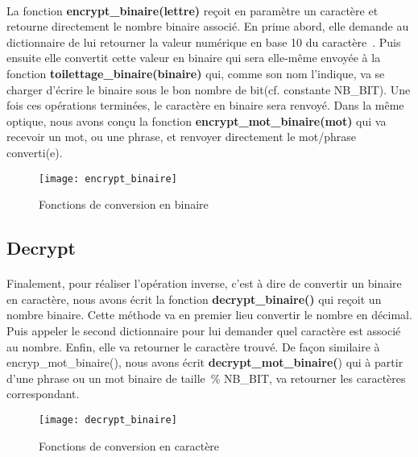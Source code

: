 \documentclass[11pt,fleqn]{book} %
\begin{document}
\paragraph{}La fonction \textbf{encrypt\_binaire(lettre)} reçoit en paramètre un caractère et retourne directement le nombre binaire associé. En prime abord, elle demande au dictionnaire de lui retourner la valeur numérique en base 10 du caractère . Puis ensuite elle convertit cette valeur en binaire qui sera elle-même envoyée à la fonction \textbf{toilettage\_binaire(binaire)} qui, comme son nom l'indique, va se charger d'écrire le binaire sous le bon nombre de bit(cf. constante NB\_BIT).
Une fois ces opérations terminées, le caractère en binaire sera renvoyé.
\vspace{0.5cm}Dans la même optique, nous avons conçu la fonction \textbf{encrypt\_mot\_binaire(mot)}  qui va recevoir un mot, ou une phrase, et renvoyer directement le mot/phrase converti(e). 

\begin{figure}[h]
\centering\texttt{[image: encrypt\_binaire]}
\caption{Fonctions de conversion en binaire}
\end{figure}


\subsection{Decrypt}

\paragraph{}Finalement, pour réaliser l'opération inverse, c'est à dire de convertir un binaire en caractère, nous avons écrit la fonction \textbf{decrypt\_binaire()} qui reçoit un nombre binaire. Cette méthode va en premier lieu convertir le nombre en décimal. Puis appeler le second dictionnaire pour lui demander quel caractère est associé au nombre. Enfin, elle va retourner le caractère trouvé. De façon similaire à encryp\_mot\_binaire(), nous avons écrit \textbf{decrypt\_mot\_binaire(}) qui à partir d'une phrase ou un mot binaire de taille \% NB\_BIT, va retourner les caractères correspondant.

\begin{figure}[h]
\centering\texttt{[image: decrypt\_binaire]}
\caption{Fonctions de conversion en caractère}
\end{figure}
\end{document}
